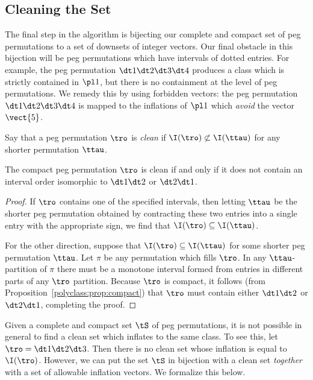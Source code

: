 \documentclass[12pt,twoside]{memoir}
\begin{document}
    \subsection{Cleaning the Set}

      The final step in the algorithm is bijecting our complete and compact set
      of peg permutations to a set of downsets of integer vectors. Our final
      obstacle in this bijection will be peg permutations which have intervals of
      dotted entries. For example, the peg permutation $\dt 1 \dt 2 \dt 3 \dt 4$
      produces a class which is strictly contained in $\pl 1$, but there is no
      containment at the level of peg permutations. We remedy this by using
      forbidden vectors: the peg permutation $\dt 1 \dt2 \dt 3 \dt4$ is mapped to
      the inflations of $\pl 1$ which \emph{avoid} the vector $\vect{5}$. 

      \begin{definition} \label{polyclass:def:clean}
        Say that a peg permutation $\tro$ is \emph{clean} if $\I(\tro) \not
        \subset \I(\ttau)$ for any shorter permutation $\ttau$. 
      \end{definition}

      \begin{proposition}\label{polyclass:prop:clean}
        The compact peg permutation $\tro$ is clean if and only if it does not
        contain an interval order isomorphic to $\dt 1 \dt 2$ or $\dt 2 \dt 1$. 
      \end{proposition}
      \begin{proof}
        If $\tro$ contains one of the specified intervals, then letting $\ttau$ be
        the shorter peg permutation obtained by contracting these two entries
        into a single entry with the appropriate sign, we find that $\I(\tro)
        \subseteq \I(\ttau)$. 

        For the other direction, suppose that $\I(\tro) \subseteq \I(\ttau)$ for
        some shorter peg permutation $\ttau$. Let $\pi$ be any permutation which
        fills $\tro$. In any $\ttau$-partition of $\pi$ there must be a monotone
        interval formed from entries in different parts of any $\tro$ partition.
        Because $\tro$ is compact, it follows (from
        Proposition~\ref{polyclass:prop:compact}) that $\tro$ must contain either
        $\dt 1 \dt 2$ or $\dt 2 \dt 1$, completing the proof.
      \end{proof}

      Given a complete and compact set $\tS$ of peg permutations, it is not
      possible in general to find a clean set which inflates to the same class.
      To see this, let $\tro = \dt 1 \dt 2 \dt 3$. Then there is no clean set
      whose inflation is equal to $\I(\tro)$. However, we can put the set $\tS$
      in bijection with a clean set \emph{together} with a set of allowable
      inflation vectors. We formalize this below. 
\end{document}
